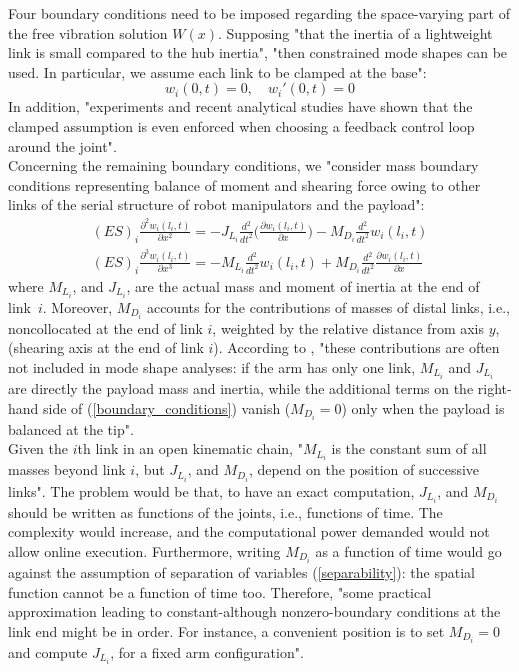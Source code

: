 \documentclass[a4paper,12pt,oneside]{report}
\begin{document}
Four boundary conditions need to be imposed regarding the space-varying part of the free vibration solution $W(x)$. Supposing "that the inertia of a lightweight link is small compared to the hub inertia", "then constrained mode shapes can be used. In particular, we assume each link to be clamped at the base"\cite{eighteen}:
\begin{equation}
  w_i(0,t)=0, \quad w_i'(0,t)=0
\end{equation} 
In addition, "experiments and recent analytical studies have shown that the clamped assumption is even enforced when choosing a feedback control loop around the joint"\cite{eighteen}.\\
Concerning the remaining boundary conditions, we "consider mass boundary conditions representing balance of moment and shearing force owing to other links of the serial structure of robot manipulators and the payload"\cite{seventeen,eighteen}:
\begin{equation}
  \begin{array}{c}
  (ES)_i\frac{\partial^2w_i(l_i,t)}{\partial x^2}=-J_{L_i}\frac{d^2}{dt^2}\Big(\frac{\partial w_i(l_i,t)}{\partial x}\Big)-M_{D_i}\frac{d^2}{dt^2}w_i(l_i,t)\\
  (ES)_i\frac{\partial^3w_i(l_i,t)}{\partial x^3}=-M_{L_i}\frac{d^2}{dt^2}w_i(l_i,t)+M_{D_i}\frac{d^2}{dt^2}\frac{\partial w_i(l_i,t)}{\partial x}
  \end{array}
  \label{boundary_conditions}
\end{equation}
where $M_{L_i}$, and $J_{L_i}$, are the actual mass and moment of inertia at the end of link~$i$. Moreover, $M_{D_i}$ accounts for the contributions of masses of distal links, i.e., noncollocated at the end of link $i$, weighted by the relative distance from axis $y$, (shearing axis at the end of link $i$). According to \cite{eighteen}, "these contributions are often not included in mode shape analyses: if the arm has only one link, $M_{L_i}$  and $J_{L_i}$ are directly the payload mass and inertia, while the additional terms on the right-hand side of (\ref{boundary_conditions}) vanish ($M_{D_i}=0$) only when the payload is balanced at the tip".\\ 
Given the $i$th link in an open kinematic chain, "$M_{L_i}$ is the constant sum of all masses beyond link $i$, but $J_{L_i}$, and $M_{D_i}$, depend on the position of successive links"\cite{eighteen}. The problem would be that, to have an exact computation, $J_{L_i}$, and $M_{D_i}$ should be written as functions of the joints, i.e., functions of time. The complexity would increase, and the computational power demanded would not allow online execution. Furthermore, writing $M_{D_i}$ as a function of time would go against the assumption of separation of variables (\ref{separability}): the spatial function cannot be a function of time too. Therefore, "some practical approximation leading to constant-although nonzero-boundary conditions at the link end might be in order. For instance, a convenient position is to set $M_{D_i}=0$ and compute $J_{L_i}$, for a fixed arm configuration"\cite{eighteen}.\\
\end{document}
